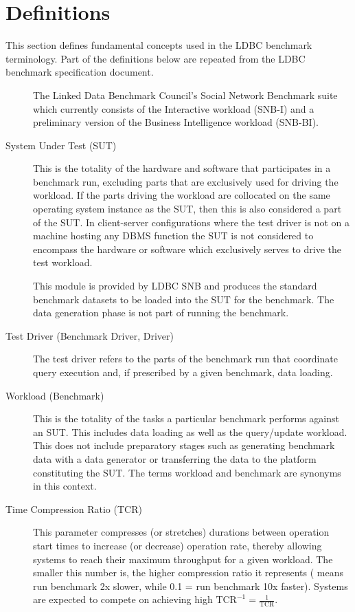 \chapter*{Definitions}

This section defines fundamental concepts used in the LDBC benchmark terminology. Part of the definitions below are repeated from the LDBC benchmark specification document.

\begin{description}
    \item[\ldbcsnb] The Linked Data Benchmark Council's Social Network Benchmark suite which currently consists of the Interactive workload (SNB-I) and a preliminary version of the Business Intelligence workload (SNB-BI).
    
    \item[System Under Test (SUT)] This is the totality of the hardware and software that participates in a benchmark run, excluding parts that are exclusively used for driving the workload. If the parts driving the workload are collocated on the same operating system instance as the SUT, then this is also considered a part of the SUT. In client-server configurations where the test driver is not on a machine hosting any DBMS function the SUT is not considered to encompass the hardware or software which exclusively serves to drive the test workload.
    
    \item[\datagen] This module is provided by LDBC SNB and produces the standard benchmark datasets to be loaded into the SUT for the benchmark. The data generation phase is not part of running the benchmark.
 
    \item[Test Driver (Benchmark Driver, Driver)] The test driver refers to the parts of the benchmark run that coordinate query execution and, if prescribed by a given benchmark, data loading.
    
    \item[Workload (Benchmark)] This is the totality of the tasks a particular benchmark performs against an SUT. This includes data loading as well as the query/update workload. This does not include preparatory stages such as generating benchmark data with a data generator or transferring the data to the platform constituting the SUT. 
    The terms workload and benchmark are synonyms in this context. 

    \item[Time Compression Ratio (TCR)]
    This parameter compresses (or stretches) durations between operation start times to increase (or decrease) operation rate, thereby allowing systems to reach their maximum throughput for a given workload. The smaller this number is, the higher compression ratio it represents ( means run benchmark 2x slower, while 0.1 = run benchmark 10x faster). Systems are expected to compete on achieving high $\text{TCR}^{-1}=\frac{1}{\text{TCR}}$.
    

\end{description}
